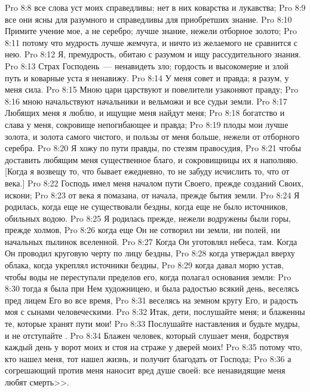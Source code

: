 \vs Pro 8:8 все слова уст моих справедливы; нет в них коварства и лукавства;
\vs Pro 8:9 все они ясны для разумного и справедливы для приобретших знание.
\vs Pro 8:10 Примите учение мое, а не серебро; лучше знание, нежели отборное золото;
\vs Pro 8:11 потому что мудрость лучше жемчуга, и ничто из желаемого не сравнится с нею.
\vs Pro 8:12 Я, премудрость, обитаю с разумом и ищу рассудительного знания.
\vs Pro 8:13 Страх Господень~--- ненавидеть зло; гордость и высокомерие и злой путь и коварные уста я ненавижу.
\vs Pro 8:14 У меня совет и правда; я разум, у меня сила.
\vs Pro 8:15 Мною цари царствуют и повелители узаконяют правду;
\vs Pro 8:16 мною начальствуют начальники и вельможи и все судьи земли.
\vs Pro 8:17 Любящих меня я люблю, и ищущие меня найдут меня;
\vs Pro 8:18 богатство и слава у меня, сокровище непогибающее и правда;
\vs Pro 8:19 плоды мои лучше золота, и золота самого чистого, и пользы от меня больше, нежели от отборного серебра.
\vs Pro 8:20 Я хожу по пути правды, по стезям правосудия,
\vs Pro 8:21 чтобы доставить любящим меня существенное благо, и сокровищницы их я наполняю. [Когда я возвещу то, что бывает ежедневно, то не забуду исчислить то, что от века.]
\rsbpar\vs Pro 8:22 Господь имел меня началом пути Своего, прежде созданий Своих, искони;
\vs Pro 8:23 от века я помазана, от начала, прежде бытия земли.
\vs Pro 8:24 Я родилась, когда еще не существовали бездны, когда еще не было источников, обильных водою.
\vs Pro 8:25 Я родилась прежде, нежели водружены были горы, прежде холмов,
\vs Pro 8:26 когда еще Он не сотворил ни земли, ни полей, ни начальных пылинок вселенной.
\vs Pro 8:27 Когда Он уготовлял небеса,  там. Когда Он проводил круговую черту по лицу бездны,
\vs Pro 8:28 когда утверждал вверху облака, когда укреплял источники бездны,
\vs Pro 8:29 когда давал морю устав, чтобы воды не переступали пределов его, когда полагал основания земли:
\vs Pro 8:30 тогда я была при Нем художницею, и была радостью всякий день, веселясь пред лицем Его во все время,
\vs Pro 8:31 веселясь на земном кругу Его, и радость моя  с сынами человеческими.
\rsbpar\vs Pro 8:32 Итак, дети, послушайте меня; и блаженны те, которые хранят пути мои!
\vs Pro 8:33 Послушайте наставления и будьте мудры, и не отступайте .
\vs Pro 8:34 Блажен человек, который слушает меня, бодрствуя каждый день у ворот моих и стоя на страже у дверей моих!
\vs Pro 8:35 потому что, кто нашел меня, тот нашел жизнь, и получит благодать от Господа;
\vs Pro 8:36 а согрешающий против меня наносит вред душе своей: все ненавидящие меня любят смерть>>.
